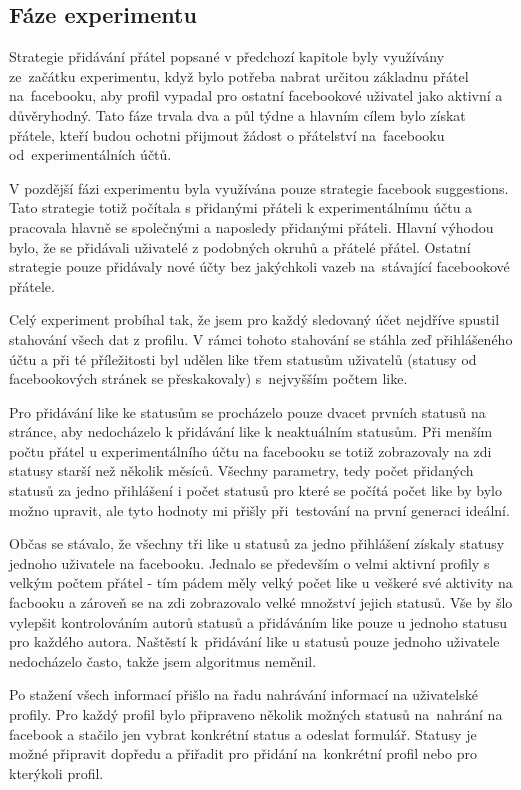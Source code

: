 \documentclass[thesis=M,czech]{FITthesis}[2013/05/10]
\begin{document}
\subsection{Fáze experimentu}

Strategie přidávání přátel popsané v předchozí kapitole byly využívány ze~začátku experimentu, když bylo potřeba nabrat určitou základnu přátel na~facebooku, aby profil vypadal pro ostatní facebookové uživatel jako aktivní a důvěryhodný. Tato fáze trvala dva a půl týdne a hlavním cílem bylo získat přátele, kteří budou ochotni přijmout žádost o přátelství na~facebooku od~experimentálních účtů. 

V pozdější fázi experimentu byla využívána pouze strategie facebook suggestions. Tato strategie totiž počítala s přidanými přáteli k experimentálnímu účtu a pracovala hlavně se společnými a naposledy přidanými přáteli. Hlavní výhodou bylo, že se přidávali uživatelé z podobných okruhů a přátelé přátel. Ostatní strategie pouze přidávaly nové účty bez jakýchkoli vazeb na~stávající facebookové přátele. 

Celý experiment probíhal tak, že jsem pro každý sledovaný účet nejdříve spustil stahování všech dat z profilu. V rámci tohoto stahování se stáhla zeď přihlášeného účtu a při té příležitosti byl udělen like třem statusům uživatelů (statusy od facebookových stránek se přeskakovaly) s~nejvyšším počtem like.

Pro přidávání like ke statusům se procházelo pouze dvacet prvních statusů na stránce, aby nedocházelo k přidávání like k neaktuálním statusům. Při menším počtu přátel u experimentálního účtu na facebooku se totiž zobrazovaly na zdi statusy starší než několik měsíců. Všechny parametry, tedy počet přidaných statusů za jedno přihlášení i počet statusů pro které se počítá počet like by bylo možno upravit, ale tyto hodnoty mi přišly při~testování na první generaci ideální.

Občas se stávalo, že všechny tři like u statusů za jedno přihlášení získaly statusy jednoho uživatele na facebooku. Jednalo se především o velmi aktivní profily s velkým počtem přátel - tím pádem měly velký počet like u veškeré své aktivity na facbooku a zároveň se na zdi zobrazovalo velké množství jejich statusů. Vše by šlo vylepšit kontrolováním autorů statusů a přidáváním like pouze u jednoho statusu pro každého autora. Naštěstí k~přidávání like u statusů pouze jednoho uživatele nedocházelo často, takže jsem algoritmus neměnil.

Po stažení všech informací přišlo na řadu nahrávání informací na uživatelské profily. Pro každý profil bylo připraveno několik možných statusů na~nahrání na facebook a stačilo jen vybrat konkrétní status a odeslat formulář. Statusy je možné připravit dopředu a přiřadit pro přidání na~konkrétní profil nebo pro kterýkoli profil.
\end{document}
